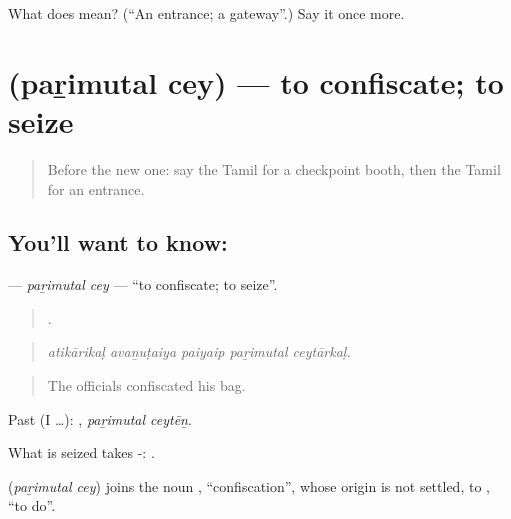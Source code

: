 \begin{tcolorbox}[breakable,colback=teal!4,colframe=teal!35!black,title={Before you move on}]
What does  mean? (\textquotedblleft{}An entrance; a gateway\textquotedblright{}.) Say it once more.
\end{tcolorbox}
\section[\texorpdfstring{\ta{பறிமுதல்} \ta{செய்} (paṟimutal cey)}{பறிமுதல் செய் (paṟimutal cey)}]{  (paṟimutal cey) — to confiscate; to seize}

\label{lesson:TA-C414-parimutal-cey}



\begin{quote}
Before the new one: say the Tamil for a checkpoint booth, then the Tamil for an entrance.
\end{quote}

\subsection*{You'll want to know:  }
\textbf{ } — \emph{paṟimutal cey} — \textquotedblleft{}to confiscate; to seize\textquotedblright{}.

\begin{quote}
    .
\end{quote}

\begin{quote}
\emph{atikārikaḷ avaṉuṭaiya paiyaip paṟimutal ceytārkaḷ.}
\end{quote}

\begin{quote}
The officials confiscated his bag.
\end{quote}

Past (I …):  , \emph{paṟimutal ceytēṉ}.

What is seized takes -:   .

\begin{cousinweb}
\textbf{ } (\emph{paṟimutal cey}) joins the noun , \textquotedblleft{}confiscation\textquotedblright{}, whose origin is not settled, to , \textquotedblleft{}to do\textquotedblright{}.
\end{cousinweb}

